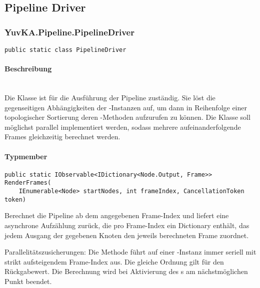 \subsection{Pipeline Driver}

\subsubsection{YuvKA.Pipeline.PipelineDriver}

\begin{verbatim}
public static class PipelineDriver
\end{verbatim}

\paragraph{Beschreibung}~\\
Die Klasse  ist für die Ausführung der Pipeline zuständig. Sie löst die gegenseitigen Abhängigkeiten der -Instanzen auf, um dann in Reihenfolge einer topologischer Sortierung deren -Methoden aufzurufen zu können.
Die Klasse soll möglichst parallel implementiert werden, sodass mehrere aufeinanderfolgende Frames gleichzeitig berechnet werden.

\paragraph{Typmember}
\begin{itemize}

	\begin{verbatim}
public static IObservable<IDictionary<Node.Output, Frame>> RenderFrames(
    IEnumerable<Node> startNodes, int frameIndex, CancellationToken token)
    \end{verbatim}
	Berechnet die Pipeline ab dem angegebenen Frame-Index und liefert eine asynchrone Aufzählung zurück, die pro Frame-Index ein Dictionary enthält, das jedem Ausgang der gegebenen Knoten  den jeweils berechneten Frame zuordnet.

    Parallelitätszusicherungen: Die Methode führt auf einer -Instanz  immer seriell mit strikt aufsteigendem Frame-Index aus. Die gleiche Ordnung gilt für den Rückgabewert. Die Berechnung wird bei Aktivierung des s am nächstmöglichen Punkt beendet.

\end{itemize}
